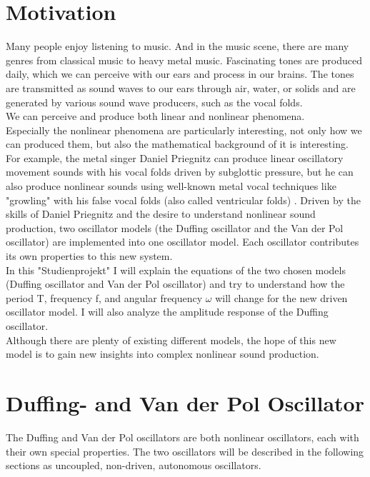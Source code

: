 \documentclass[oneside,10pt,a4paper]{report}
\begin{document}
	
	\tableofcontents
	\chapter{Motivation}
	
		Many people enjoy listening to music. And in the music scene, there are many genres from classical music to heavy metal music. Fascinating tones are produced daily, which we can perceive with our ears and process in our brains. The tones are transmitted as sound waves to our ears through air, water, or solids and are generated by various sound wave producers, such as the vocal folds.\\
		We can perceive and produce both linear and nonlinear phenomena. \\
		Especially the nonlinear phenomena are particularly interesting, not only how we can produced them, but also the mathematical background of it is interesting.\\
		 For example, the metal singer Daniel Priegnitz can produce linear oscillatory movement sounds with his vocal folds driven by subglottic pressure, but he can also produce nonlinear sounds using well-known metal vocal techniques like "growling" with his false vocal folds (also called ventricular folds) \cite{DanielPriegnitz}.
		 Driven by the skills of Daniel Priegnitz and the desire to understand nonlinear sound production, two oscillator models (the Duffing oscillator and the Van der Pol oscillator) are implemented into one oscillator model. Each oscillator contributes its own properties to this new system.\\
		 In this "Studienprojekt" I will explain the equations of the two chosen models (Duffing oscillator and Van der Pol oscillator) and try to understand how the period T, frequency f, and angular frequency $\omega$ will change for the new driven oscillator model. I will also analyze the amplitude response of the Duffing oscillator.\\
		 Although there are plenty of existing different models, the hope of this new model is to gain new insights into complex nonlinear sound production.\\
		
	\chapter{Duffing- and Van der Pol Oscillator} \label{chapter: Duffing- and Van der Pol Oscillator}
	
		The Duffing and Van der Pol oscillators are both nonlinear oscillators, each with their own special properties. 
		The two oscillators will be described in the following sections as uncoupled, non-driven, autonomous oscillators.
		
\end{document}
